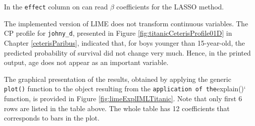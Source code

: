 \documentclass[12pt,]{krantz}
\newenvironment{Shaded}{\begin{snugshade}}{\end{snugshade}}
\newcommand{\CommentTok}[1]{\textcolor[rgb]{0.56,0.35,0.01}{\textit{#1}}}
\newcommand{\DataTypeTok}[1]{\textcolor[rgb]{0.13,0.29,0.53}{#1}}
\newcommand{\DecValTok}[1]{\textcolor[rgb]{0.00,0.00,0.81}{#1}}
\newcommand{\KeywordTok}[1]{\textcolor[rgb]{0.13,0.29,0.53}{\textbf{#1}}}
\newcommand{\NormalTok}[1]{#1}
\newcommand{\OperatorTok}[1]{\textcolor[rgb]{0.81,0.36,0.00}{\textbf{#1}}}
\newcommand{\StringTok}[1]{\textcolor[rgb]{0.31,0.60,0.02}{#1}}
\begin{document}
\begin{Shaded}
\end{Shaded}

In the \texttt{effect} column on can read \(\beta\) coefficients for the LASSO method.

The implemented version of LIME does not transform continuous variables. The CP profile for \texttt{johny\_d}, presented in Figure \ref{fig:titanicCeterisProfile01D} in Chapter \ref{ceterisParibus}, indicated that, for boys younger than 15-year-old, the predicted probability of survival did not change very much. Hence, in the printed output, age does not appear as an important variable.

The graphical presentation of the results, obtained by applying the generic \texttt{plot()} function to the object resulting from the \texttt{application\ of\ the}explain()` function, is provided in Figure \ref{fig:limeExplIMLTitanic}. Note that only first 6 rows are listed in the table above. The whole table has 12 coefficients that corresponds to bars in the plot.
\end{document}
